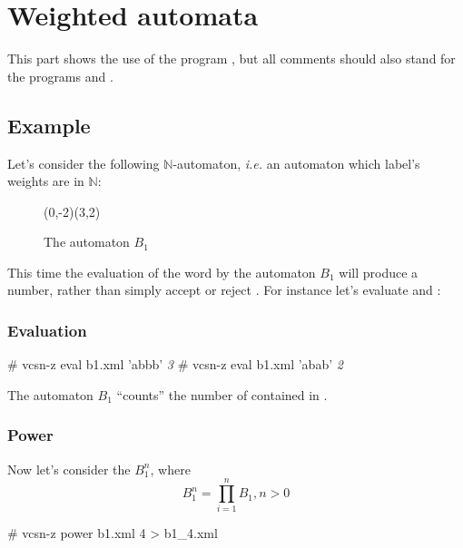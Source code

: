 \section{Weighted automata}

This part shows the use of the program , but all
comments should also stand for the programs
 and .

\subsection{Example}

Let's consider the following $\mathbb{N}$-automaton, \textit{i.e.}
an automaton which label's weights are in $\mathbb{N}$:

\begin{figure}[ht] \centering
  \begin{VCPicture}{(0,-2)(3,2)}
     
     
     
     
  \end{VCPicture}
  \caption{The automaton $B_1$}
\end{figure}

This time the evaluation of the word  by the automaton $B_1$
will produce a number, rather than simply accept or reject .
For instance let's evaluate  and :

\subsubsection{Evaluation}

\begin{shell}
# vcsn-z eval b1.xml 'abbb'
\textit{3}
# vcsn-z eval b1.xml 'abab'
\textit{2}
\end{shell}

The automaton $B_1$ ``counts'' the number of  contained in
.

\subsubsection{Power}

Now let's consider the $B_1^n$, where
$$B_1^n = \prod_{i=1}^n B_1, n > 0$$

\begin{shell}
# vcsn-z power b1.xml 4 > b1_4.xml
\end{shell}


